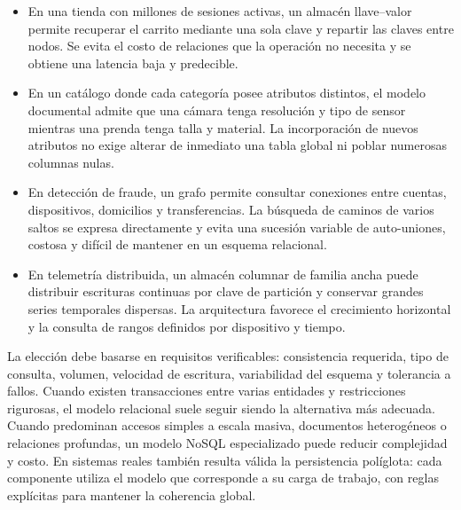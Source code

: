 \begin{tcolorbox}[colback=softblue,colframe=unamblue,title=Ejemplos de elección]
\begin{itemize}
  \item En una tienda con millones de sesiones activas, un almacén
  llave--valor permite recuperar el carrito mediante una sola clave y repartir
  las claves entre nodos. Se evita el costo de relaciones que la operación no
  necesita y se obtiene una latencia baja y predecible.
  \item En un catálogo donde cada categoría posee atributos distintos, el modelo
  documental admite que una cámara tenga resolución y tipo de sensor mientras
  una prenda tenga talla y material. La incorporación de nuevos atributos no
  exige alterar de inmediato una tabla global ni poblar numerosas columnas
  nulas.
  \item En detección de fraude, un grafo permite consultar conexiones entre
  cuentas, dispositivos, domicilios y transferencias. La búsqueda de caminos de
  varios saltos se expresa directamente y evita una sucesión variable de
  auto-uniones, costosa y difícil de mantener en un esquema relacional.
  \item En telemetría distribuida, un almacén columnar de familia ancha puede
  distribuir escrituras continuas por clave de partición y conservar grandes
  series temporales dispersas. La arquitectura favorece el crecimiento
  horizontal y la consulta de rangos definidos por dispositivo y tiempo.
\end{itemize}
\end{tcolorbox}

La elección debe basarse en requisitos verificables: consistencia requerida,
tipo de consulta, volumen, velocidad de escritura, variabilidad del esquema y
tolerancia a fallos. Cuando existen transacciones entre varias entidades y
restricciones rigurosas, el modelo relacional suele seguir siendo la alternativa
más adecuada. Cuando predominan accesos simples a escala masiva, documentos
heterogéneos o relaciones profundas, un modelo NoSQL especializado puede
reducir complejidad y costo. En sistemas reales también resulta válida la
persistencia políglota: cada componente utiliza el modelo que corresponde a su
carga de trabajo, con reglas explícitas para mantener la coherencia global.
